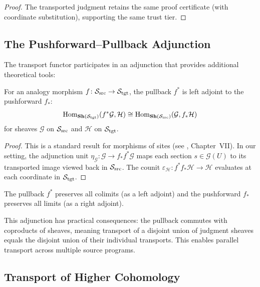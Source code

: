 \documentclass[11pt]{article}
\newcommand{\SourceSite}{\Site_{\mathrm{src}}}
\newcommand{\TargetSite}{\Site_{\mathrm{tgt}}}
\begin{document}
\begin{proof}
The transported judgment retains the same proof certificate (with
coordinate substitution), supporting the same trust tier.
\end{proof}

\subsection{The Pushforward--Pullback Adjunction}

The transport functor participates in an adjunction that provides
additional theoretical tools:

\begin{proposition}[Adjunction]\label{prop:adjunction}
For an analogy morphism $f \colon \SourceSite \to \TargetSite$, the
pullback $f^{*}$ is left adjoint to the pushforward $f_{*}$:
\[
  \mathrm{Hom}_{\mathbf{Sh}(\TargetSite)}(f^{*}\mathcal{G}, \mathcal{H})
  \cong
  \mathrm{Hom}_{\mathbf{Sh}(\SourceSite)}(\mathcal{G}, f_{*}\mathcal{H})
\]
for sheaves $\mathcal{G}$ on $\SourceSite$ and $\mathcal{H}$ on
$\TargetSite$.
\end{proposition}

\begin{proof}
This is a standard result for morphisms of sites (see
\cite{MacLane1994}, Chapter~VII).  In our setting, the adjunction unit
$\eta_{\mathcal{G}} \colon \mathcal{G} \to f_{*}f^{*}\mathcal{G}$ maps
each section $s \in \mathcal{G}(U)$ to its transported image viewed
back in $\SourceSite$.  The counit
$\varepsilon_{\mathcal{H}} \colon f^{*}f_{*}\mathcal{H} \to \mathcal{H}$
evaluates at each coordinate in $\TargetSite$.
\end{proof}

\begin{corollary}\label{cor:limits}
The pullback $f^{*}$ preserves all colimits (as a left adjoint) and
the pushforward $f_{*}$ preserves all limits (as a right adjoint).
\end{corollary}

This adjunction has practical consequences: the pullback commutes with
coproducts of sheaves, meaning transport of a disjoint union of
judgment sheaves equals the disjoint union of their individual
transports.  This enables parallel transport across multiple source
programs.

\subsection{Transport of Higher Cohomology}
\end{document}
